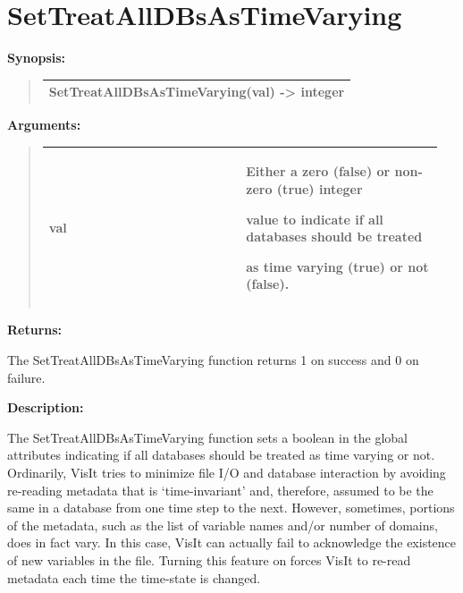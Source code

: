 \documentclass[letterpaper,10pt,english]{sphinxmanual}
\begin{document}
\section{SetTreatAllDBsAsTimeVarying}
\label{functions:settreatalldbsastimevarying}
\begin{DUlineblock}{0em}
\item[] \textbf{Synopsis:}
\end{DUlineblock}
\begin{quote}

\begin{tabulary}{\linewidth}{|L|}
\hline

SetTreatAllDBsAsTimeVarying(val) -\textgreater{} integer
\\
\hline\end{tabulary}

\end{quote}

\begin{DUlineblock}{0em}
\item[] 
\item[] \textbf{Arguments:}
\end{DUlineblock}
\begin{quote}

\begin{tabular}{|p{0.475\linewidth}|p{0.475\linewidth}|}
\hline

val
 & 
\begin{DUlineblock}{0em}
\item[] Either a zero (false) or non-zero (true) integer
\item[] value to indicate if all databases should be treated
\item[] as time varying (true) or not (false).
\end{DUlineblock}
\\
\hline\end{tabular}

\end{quote}

\begin{DUlineblock}{0em}
\item[] 
\item[] \textbf{Returns:}
\item[] The SetTreatAllDBsAsTimeVarying function returns 1 on success and 0 on failure.
\item[] 
\item[] \textbf{Description:}
\item[] The SetTreatAllDBsAsTimeVarying function sets a boolean in the global attributes
indicating if all databases should be treated as time varying or not. Ordinarily,
VisIt tries to minimize file I/O and database interaction by avoiding re-reading
metadata that is `time-invariant' and, therefore, assumed to be the same in a
database from one time step to the next. However, sometimes, portions of the metadata,
such as the list of variable names and/or number of domains, does in fact vary. In this
case, VisIt can actually fail to acknowledge the existence of new variables in the file.
Turning this feature on forces VisIt to re-read metadata each time the time-state is
changed.
\end{DUlineblock}
\end{document}
